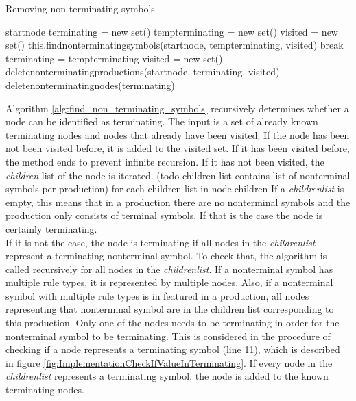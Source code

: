 \begin{algorithm}[H]
\caption{Removing non terminating symbols}
\begin{algorithmic}[1] 
\Require start\textunderscore node
\State terminating = new set()
\State temp\textunderscore terminating = new set()
	\State visited = new set()
	\State this.find\textunderscore non\textunderscore terminating\textunderscore symbols(start\textunderscore node, temp\textunderscore terminating, visited)
		\State break
	\Else
		\State terminating = temp\textunderscore terminating
	\EndIf
\EndWhile
\State visited = new set() 
\State delete\textunderscore non\textunderscore terminating\textunderscore productions(start\textunderscore node, terminating, visited)
\State delete\textunderscore non\textunderscore terminating\textunderscore nodes(terminating)
\end{algorithmic}
\label{alg:remove_non_terminating_symbols}
\end{algorithm}

Algorithm \ref{alg:find_non_terminating_symbols}  recursively determines whether a node can be identified as terminating.
The input is a set of already known terminating nodes and nodes that already have been visited.
If the node has been not been visited before, it is added to the visited set.
If it has been visited before, the method ends to prevent infinite recursion.
If it has not been visited, the \textit{children} list of the node is iterated. (todo children list contains list of nonterminal symbols per production)
for each children list in node.children
If a \textit{children\textunderscore list} is empty, this means that in a production there are no nonterminal symbols and the production only consists of terminal symbols. If that is the case the node is certainly terminating.\\
If it is not the case, the node is terminating if all nodes in the \textit{children\textunderscore list} represent a terminating nonterminal symbol.
To check that, the algorithm is called recursively for all nodes in the \textit{children\textunderscore list}.
If a nonterminal symbol has multiple rule types, it is represented by multiple nodes. Also, if a nonterminal symbol with multiple rule types is in featured in a production, all nodes representing that nonterminal symbol are in the children list corresponding to this production. Only one of the nodes needs to be terminating in order for the nonterminal symbol to be terminating.
This is considered in the procedure of checking if a node represents a terminating symbol (line 11), which is described in figure \ref{fig:ImplementationCheckIfValueInTerminating}.
If every node in the \textit{children\textunderscore list} represents a terminating symbol, the node is added to the known terminating nodes.

